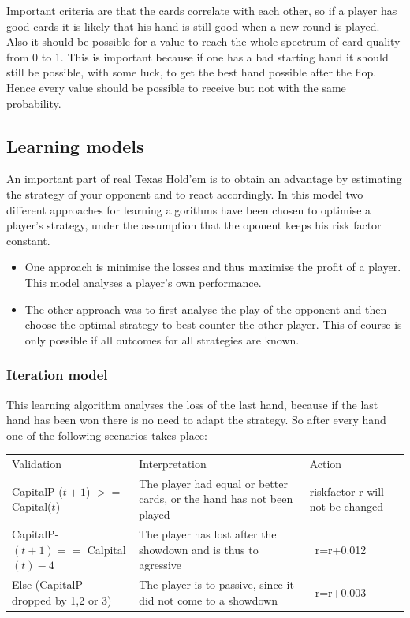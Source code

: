 \documentclass[11pt]{article}
\begin{document}
Important criteria are that the cards correlate with each other, so if a player has good cards it is likely that his hand is still good when a new round is played. Also it should be possible for a value to reach the whole spectrum of card quality from 0 to 1. This is important because if one has a bad starting hand it should still be possible, with some luck, to get the best hand possible after the flop. Hence every value should be possible to receive but not with the same probability.\\


\subsection{Learning models}
An important part of real Texas Hold’em is to obtain an advantage by estimating the strategy of your opponent and to react accordingly.
In this model two different approaches for learning algorithms have been chosen to optimise a player's strategy, under the assumption that the oponent keeps his risk factor constant.
\begin{itemize}
\item One approach is minimise the losses and thus maximise the profit of a player. This model analyses a player's own performance.
\item  The other approach was to first analyse the play of the opponent and then choose the optimal strategy to best counter the other player. This of course is only possible if all outcomes for all strategies are known.\\
\end{itemize}

\subsubsection{Iteration model}
This learning algorithm analyses the loss of the last hand, because if the last hand has been won there is no need to adapt the strategy. So after every hand one of the following scenarios takes place:\\

\renewcommand{\arraystretch}{1.4}
\begin{tabular}{ p{6.45cm}  p{5.1cm}  p{2.4cm}}
Validation & Interpretation & Action\\
\addlinespace
\hline
\hline

CapitalP-($t+1$) $>=$ Capital($t$) &	The player had equal or better cards, or the hand has not been played&
riskfactor r will not be changed \\
\addlinespace
CapitalP-$(t+1) ==$ Calpital$(t)-4$	&	The player has lost after the showdown and is thus to agressive & \ r=r+0.012\\
\addlinespace
Else (CapitalP- dropped by 1,2 or 3) &	The player is to passive, since it did not come to a showdown & \ r=r+0.003\\
\end{tabular}
\end{document}
